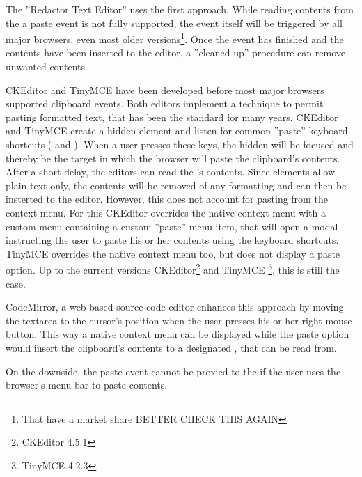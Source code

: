 The ''Redactor Text Editor'' uses the first approach. While reading contents from the a paste event is not fully supported, the event itself will be triggered by all major browsers, even most older versions\footnote{That have a market share BETTER CHECK THIS AGAIN}. Once the event has finished and the contents have been inserted to the editor, a ''cleaned up'' procedure can remove unwanted contents.

CKEditor and TinyMCE have been developed before most major browsers supported clipboard events. Both editors implement a technique to permit pasting formatted text, that has been the standard for many years. CKEditor and TinyMCE create a hidden  element and listen for common ''paste'' keyboard shortcuts ( and ). When a user presses these keys, the hidden  will be focused and thereby be the target in which the browser will paste the clipboard's contents. After a short delay, the editors can read the 's contents. Since  elements allow plain text only, the contents will be removed of any formatting and can then be insterted to the editor. However, this does not account for pasting from the context menu. For this CKEditor overrides the native context menu with a custom menu containing a custom ''paste'' menu item, that will open a modal instructing the user to paste his or her contents using the keyboard shortcuts. TinyMCE overrides the native context menu too, but does not display a paste option. Up to the current versions CKEditor\footnote{CKEditor 4.5.1 } and TinyMCE \footnote{TinyMCE 4.2.3}, this is still the case.

CodeMirror, a web-based source code editor enhances this approach by moving the textarea to the cursor's position when the user presses his or her right mouse button. This way a native context menu can be displayed while the paste option would insert the clipboard's contents to a designated , that can be read from.

On the downside, the paste event cannot be proxied to the  if the user uses the browser's menu bar to paste contents.


